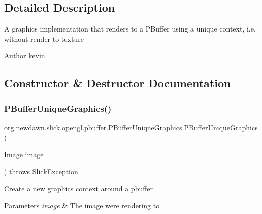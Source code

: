 \subsection{Detailed Description}
A graphics implementation that renders to a P\+Buffer using a unique context, i.\+e. without render to texture

\begin{DoxyAuthor}{Author}
kevin 
\end{DoxyAuthor}


\subsection{Constructor \& Destructor Documentation}
\mbox{\label{classorg_1_1newdawn_1_1slick_1_1opengl_1_1pbuffer_1_1_p_buffer_unique_graphics_aa735f9549c24c0daf3ce3feedbbc9f2c}} 
\subsubsection{\texorpdfstring{P\+Buffer\+Unique\+Graphics()}{PBufferUniqueGraphics()}}
{\footnotesize\ttfamily org.\+newdawn.\+slick.\+opengl.\+pbuffer.\+P\+Buffer\+Unique\+Graphics.\+P\+Buffer\+Unique\+Graphics (\begin{DoxyParamCaption}\item[{\mbox{\hyperlink{classorg_1_1newdawn_1_1slick_1_1_image}{Image}}}]{image }\end{DoxyParamCaption}) throws \mbox{\hyperlink{classorg_1_1newdawn_1_1slick_1_1_slick_exception}{Slick\+Exception}}\hspace{0.3cm}{\ttfamily [inline]}}

Create a new graphics context around a pbuffer


\begin{DoxyParams}{Parameters}
{\em image} & The image we\textquotesingle{}re rendering to \\
\hline
\end{DoxyParams}

